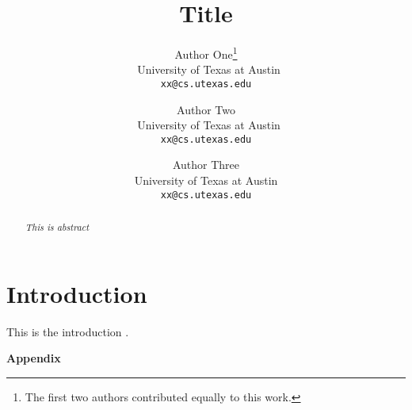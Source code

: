 \documentclass[11pt]{article}
\title{\huge Title}
\author{%
	Author One\thanks{The first two authors contributed equally to this work.}\\
    ~University of Texas at Austin\\
	\texttt{xx@cs.utexas.edu}
	\and
	Author Two\printfnsymbol{1}\\
	~University of Texas at Austin\\
	\texttt{xx@cs.utexas.edu} \\
	\and 
	Author Three\\
	University of Texas at Austin\\
	\texttt{xx@cs.utexas.edu} \\
}
\date{}
\begin{document}
\maketitle



\begin{abstract}
  \emph{This is abstract} 
\end{abstract}


\section{Introduction}

This is the introduction \citep{sutton98beinforcement}.




\clearpage


\clearpage

\onecolumn
\appendix
\begin{center}
\Large
\textbf{Appendix}
\end{center}



%
\end{document}
